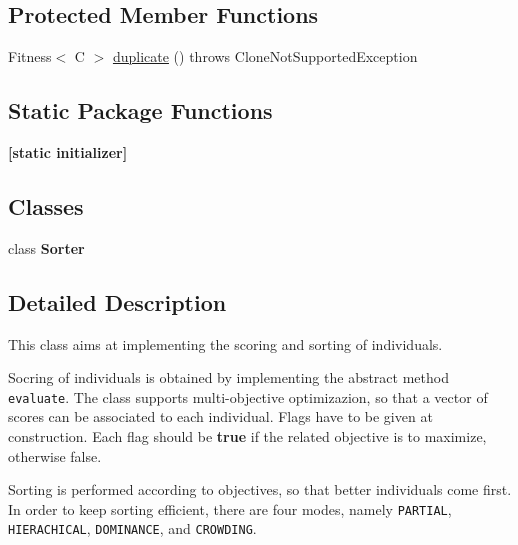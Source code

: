\subsection*{Protected Member Functions}
\begin{CompactItemize}
\item 
Fitness$<$ C $>$ \hyperlink{classjenes_1_1population_1_1_fitness_3_01_c_01extends_01_chromosome_01_4_cea9db9e50fbde7132dc1de0c3baa641}{duplicate} ()  throws CloneNotSupportedException 
\end{CompactItemize}
\subsection*{Static Package Functions}
\begin{CompactItemize}
\item 
\hypertarget{classjenes_1_1population_1_1_fitness_3_01_c_01extends_01_chromosome_01_4_510f0a31317658adfca6ba76bc92ba42}{
\textbf{\mbox{[}static initializer\mbox{]}}}
\label{classjenes_1_1population_1_1_fitness_3_01_c_01extends_01_chromosome_01_4_510f0a31317658adfca6ba76bc92ba42}

\end{CompactItemize}
\subsection*{Classes}
\begin{CompactItemize}
\item 
class \textbf{Sorter}
\end{CompactItemize}


\subsection{Detailed Description}
This class aims at implementing the scoring and sorting of individuals. 

Socring of individuals is obtained by implementing the abstract method {\tt evaluate}. The class supports multi-objective optimizazion, so that a vector of scores can be associated to each individual. Flags have to be given at construction. Each flag should be {\bf true} if the related objective is to maximize, otherwise false. 

Sorting is performed according to objectives, so that better individuals come first. In order to keep sorting efficient, there are four modes, namely {\tt PARTIAL}, {\tt HIERACHICAL}, {\tt DOMINANCE}, and {\tt CROWDING}. 

